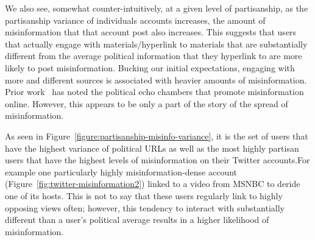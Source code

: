 We also see, somewhat counter-intuitively, at a given level of partisanship, as the partisanship variance of individuals accounts increases, the amount of misinformation that that account post also increases. This suggests that users that actually engage with materials/hyperlink to materials that are substantially different from the average political information that they hyperlink to are more likely to post misinformation. Bucking our initial expectations, engaging with more and different sources is associated with heavier amounts of misinformation. Prior work~\cite{starbird2018ecosystem} has noted the political echo chambers that promote misinformation online. However, this appears to be only a part of the story of the spread of misinformation. 

As seen in Figure~\ref{figure:partisanship-misinfo-variance}, it is the set of users that have the highest variance of political URLs as well as the most highly partisan users that have the highest levels of misinformation on their Twitter accounts.For example one particularly highly misinformation-dense account (Figure~\ref{fig:twitter-misinformation2}) linked to a video from MSNBC to deride one of its hosts. This is not to say that these users regularly link to highly opposing views often; however, this tendency to interact with substantially different than a user's political average results in a higher likelihood of misinformation. 
